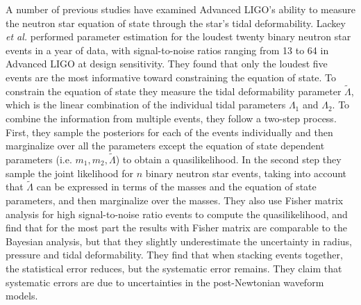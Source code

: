 A number of previous studies have examined Advanced LIGO's ability to measure the neutron star equation of state through the star's tidal deformability. Lackey \textit{et al.} \cite{Lackey:2014fwa} performed parameter estimation for the loudest twenty binary neutron star events in a year of data, with signal-to-noise ratios ranging from 13 to 64 in Advanced LIGO at design sensitivity. They found that only the loudest five events are the most informative toward constraining the equation of state. To constrain the equation of state they measure the tidal deformability parameter $\tilde{\Lambda}$, which is the linear combination of the individual tidal parameters $\Lambda_1$ and $\Lambda_2$. 
To combine the information from multiple events, they follow a two-step process. First, they sample the posteriors for each of the events individually and then marginalize over all the parameters except the equation of state dependent parameters (i.e. $m_1, m_2, \tilde{\Lambda}$) to obtain a quasilikelihood. In the second step they sample the joint likelihood for $n$ binary neutron star events, taking into account that $\tilde{\Lambda}$ can be expressed in terms of the masses and the equation of state parameters, and then marginalize over the masses. They also use Fisher matrix analysis for high signal-to-noise ratio events to compute the quasilikelihood, and find that for the most part the results with Fisher matrix are comparable to the Bayesian analysis, but that they slightly underestimate the uncertainty in  radius, pressure and tidal deformability. They find that when stacking events together, the statistical error reduces, but the systematic error remains. They claim that systematic errors are due to uncertainties in the post-Newtonian waveform models.

